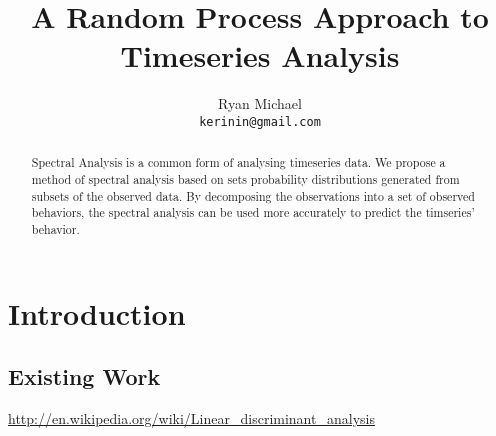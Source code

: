 \documentclass[10pt]{article}
\begin{document}
\title{A Random Process Approach to Timeseries Analysis}
\author{Ryan Michael\\ \texttt{kerinin@gmail.com}}
\maketitle

\begin{abstract}
Spectral Analysis is a common form of analysing timeseries data.  We propose a method of spectral analysis based on sets probability distributions generated from subsets of the observed data.  By decomposing the observations into a set of observed behaviors, the spectral analysis can be used more accurately to predict the timseries' behavior.

\end{abstract}

\section{Introduction}

\subsection{Existing Work}

\url{http://en.wikipedia.org/wiki/Linear_discriminant_analysis}



\end{document}
